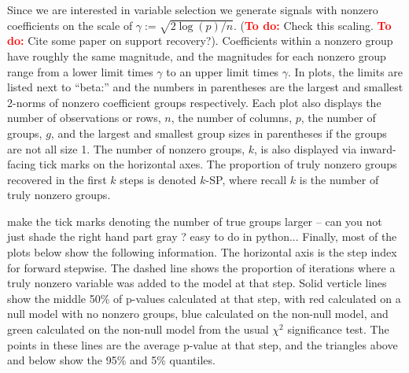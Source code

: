 \documentclass{imsart}
\newcommand{\todo}{\textcolor{red}{\textbf{To do: }}}
\newcommand{\jonathan}[1]{{\color{blue}  #1}}
\begin{document}
Since we are interested in variable selection we generate signals with
nonzero coefficients on the scale of $\gamma := \sqrt{2 \log(p)/n}$.
(\todo Check this scaling. \todo Cite some paper on support recovery?).
Coefficients within a
nonzero group have roughly the same magnitude, and the magnitudes for
each nonzero group range from a lower limit times $\gamma$ to an upper
limit times $\gamma$. In plots, the limits are listed next to ``beta:''
and the numbers in parentheses are the largest and smallest 2-norms of
nonzero coefficient groups respectively. Each plot also displays the
number of observations or rows, $n$, the number of columns, $p$, the
number of groups, $g$, and the largest and smallest group sizes in
parentheses if the groups are not all size 1. The number of nonzero
groups, $k$, is also displayed via inward-facing tick marks on the
horizontal axes. The proportion of truly
nonzero groups recovered in the first $k$ steps is denoted $k$-SP,
where recall $k$ is the number of truly nonzero groups. 

\jonathan{make the tick marks denoting the number of true groups larger -- can you not just shade the right hand part gray ? easy to do in python...}
Finally, most of the plots below show the following information. The
horizontal axis is the step index for forward stepwise. The dashed
line shows the proportion of iterations where a truly nonzero variable
was added to the model at that step. Solid verticle lines show the
middle 50\% of p-values calculated at that step, with red calculated
on a null model with no nonzero groups, blue calculated on the non-null
model, and green calculated on the non-null model from the usual
$\chi^2$ significance test.
The points in these lines are the average p-value at that step, and
the triangles above and below show the 95\% and 5\% quantiles.
\end{document}
